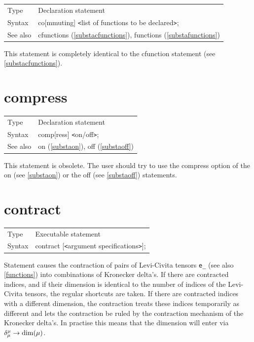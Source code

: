 \noindent \begin{tabular}{ll}
Type & Declaration statement\\
Syntax & co[mmuting] {\tt<}list of functions to be declared{\tt>}; \\
See also & cfunctions (\ref{substacfunctions}), functions (\ref{substafunctions})
\end{tabular} \vspace{4mm}

\noindent This statement is completely identical to the 
cfunction statement (see \ref{substacfunctions}). \vspace{10mm}


\section{compress}
\label{substacompress}

\noindent \begin{tabular}{ll}
Type & Declaration statement\\
Syntax & comp[ress] {\tt<}on/off{\tt>};
\\ See also & on (\ref{substaon}), off (\ref{substaoff})
\end{tabular} \vspace{4mm}

\noindent This statement is obsolete. The user should try 
to use the compress option of the on (see \ref{substaon}) or the off (see 
\ref{substaoff}) statements. \vspace{10mm}


\section{contract}
\label{substacontract}

\noindent \begin{tabular}{ll}
Type & Executable statement\\
Syntax & contract [{\tt<}argument specifications{\tt>}];
\end{tabular} \vspace{4mm}
\noindent Statement causes the contraction of pairs of 
Levi-Civita tensors \verb:e_: 
(see also \ref{functions}) into combinations of Kronecker 
delta's. If there are contracted indices, and if 
their dimension is identical to the number of indices of the Levi-Civita 
tensors, the regular shortcuts are taken. If there are contracted indices 
with a different dimension, the contraction treats these indices 
temporarily as different and lets the contraction be ruled by the 
contraction mechanism of the Kronecker delta's. In practise this means that 
the dimension will enter via $\delta^{\mu}_{\mu} \rightarrow {\rm 
dim}(\mu)$. \vspace{4mm}


